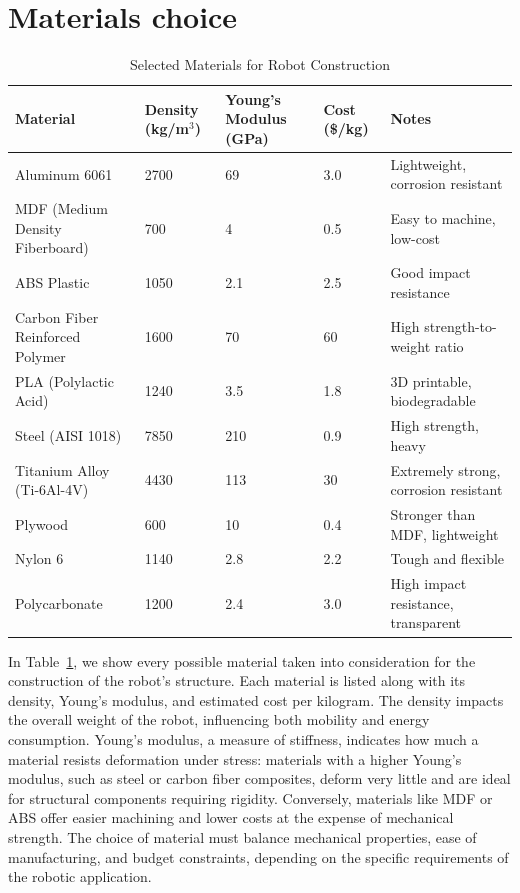 \documentclass{article}
\begin{document}
\section{Materials choice}
\begin{table}[H]
\centering
\begin{tabular}{|p{3cm}|p{2.2cm}|p{2.5cm}|p{2cm}|p{5cm}|}
\hline
\textbf{Material} & \textbf{Density (kg/m$^3$)} & \textbf{Young's Modulus (GPa)} & \textbf{Cost (\$/kg)} & \textbf{Notes} \\ \hline
Aluminum 6061       & 2700  & 69   & 3.0    & Lightweight, corrosion resistant \\ \hline
MDF (Medium Density Fiberboard) & 700   & 4    & 0.5    & Easy to machine, low-cost \\ \hline
ABS Plastic         & 1050  & 2.1  & 2.5    & Good impact resistance \\ \hline
Carbon Fiber Reinforced Polymer & 1600  & 70   & 60     & High strength-to-weight ratio \\ \hline
PLA (Polylactic Acid) & 1240 & 3.5  & 1.8    & 3D printable, biodegradable \\ \hline
Steel (AISI 1018)   & 7850  & 210  & 0.9    & High strength, heavy \\ \hline
Titanium Alloy (Ti-6Al-4V) & 4430 & 113 & 30    & Extremely strong, corrosion resistant \\ \hline
Plywood             & 600   & 10   & 0.4    & Stronger than MDF, lightweight \\ \hline
Nylon 6             & 1140  & 2.8  & 2.2    & Tough and flexible \\ \hline
Polycarbonate       & 1200  & 2.4  & 3.0    & High impact resistance, transparent \\ \hline
\end{tabular}
\caption{Selected Materials for Robot Construction}
\label{tab:materials}
\end{table}


\noindent
In Table~\ref{tab:materials}, we show every possible material taken into consideration for the construction of the robot's structure. Each material is listed along with its density, Young's modulus, and estimated cost per kilogram. The density impacts the overall weight of the robot, influencing both mobility and energy consumption. Young's modulus, a measure of stiffness, indicates how much a material resists deformation under stress: materials with a higher Young's modulus, such as steel or carbon fiber composites, deform very little and are ideal for structural components requiring rigidity. Conversely, materials like MDF or ABS offer easier machining and lower costs at the expense of mechanical strength. The choice of material must balance mechanical properties, ease of manufacturing, and budget constraints, depending on the specific requirements of the robotic application.
\end{document}
